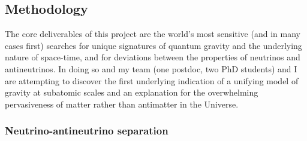 \documentclass[a4paper,11pt]{article}
\begin{document}
\subsection{Methodology}
\vspace{0.1 cm}




The core deliverables of this project are the world's most sensitive (and in many cases first) searches for unique signatures of quantum gravity and the underlying nature of space-time, and for deviations between the properties of neutrinos and antineutrinos. In doing so and my team (one postdoc, two PhD students) and I are attempting to discover the first underlying indication of a unifying model of gravity at subatomic scales and an explanation for the overwhelming pervasiveness of matter rather than antimatter in the Universe. \\


\subsubsection{Neutrino-antineutrino separation}
\end{document}
